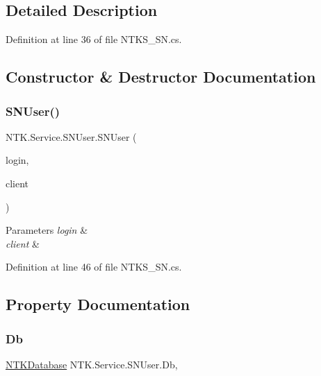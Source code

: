 \subsection{Detailed Description}




Definition at line 36 of file N\+T\+K\+S\+\_\+\+S\+N.\+cs.



\subsection{Constructor \& Destructor Documentation}
\mbox{\label{class_n_t_k_1_1_service_1_1_s_n_user_aef6d4b61dc52e2d1f149088c5f8c6dd7}} 
\subsubsection{\texorpdfstring{SNUser()}{SNUser()}}
{\footnotesize\ttfamily N\+T\+K.\+Service.\+S\+N\+User.\+S\+N\+User (\begin{DoxyParamCaption}\item[{String}]{login,  }\item[{Tcp\+Client}]{client }\end{DoxyParamCaption})}






\begin{DoxyParams}{Parameters}
{\em login} & \\
\hline
{\em client} & \\
\hline
\end{DoxyParams}


Definition at line 46 of file N\+T\+K\+S\+\_\+\+S\+N.\+cs.



\subsection{Property Documentation}
\mbox{\label{class_n_t_k_1_1_service_1_1_s_n_user_ae3e3ebbb93f1c9f50321a407393dc167}} 
\subsubsection{\texorpdfstring{Db}{Db}}
{\footnotesize\ttfamily \mbox{\hyperlink{class_n_t_k_1_1_database_1_1_n_t_k_database}{N\+T\+K\+Database}} N\+T\+K.\+Service.\+S\+N\+User.\+Db\hspace{0.3cm}{\ttfamily [get]}, {\ttfamily [set]}}







